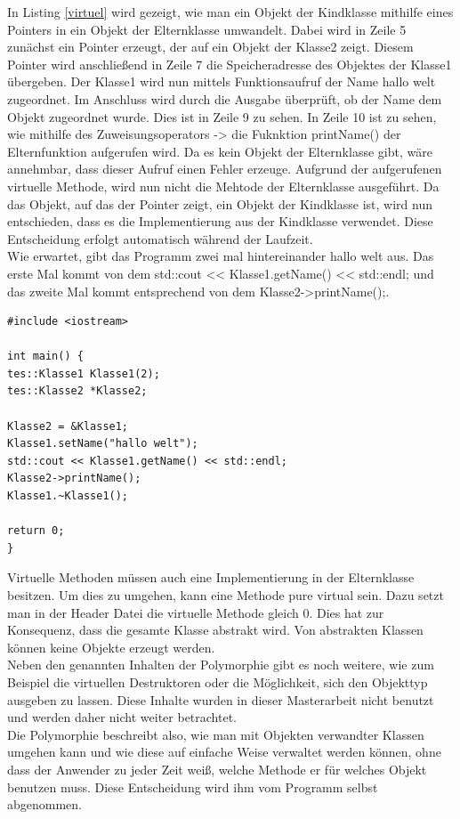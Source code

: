 In Listing \ref{virtuel} wird gezeigt, wie man ein Objekt der Kindklasse mithilfe eines Pointers in ein Objekt der Elternklasse umwandelt. Dabei wird in Zeile 5  zunächst ein Pointer erzeugt, der auf ein Objekt der Klasse2 zeigt. Diesem Pointer wird anschließend in Zeile 7 die Speicheradresse des Objektes der Klasse1 übergeben. Der Klasse1 wird nun mittels Funktionsaufruf der Name  \glqq hallo welt\grqq{} zugeordnet. Im Anschluss wird durch die Ausgabe überprüft, ob der Name dem Objekt zugeordnet wurde. Dies ist in Zeile 9 zu sehen. In Zeile 10 ist zu sehen, wie mithilfe des Zuweisungsoperators \glqq ->\grqq{} die Fuknktion \glqq printName()\grqq{} der Elternfunktion aufgerufen wird. Da es kein Objekt der Elternklasse gibt, wäre annehmbar, dass dieser Aufruf einen Fehler erzeuge. Aufgrund der aufgerufenen virtuelle Methode, wird nun nicht die Mehtode der Elternklasse ausgeführt. Da das Objekt, auf das der Pointer zeigt, ein Objekt der Kindklasse ist, wird nun entschieden, dass es die Implementierung aus der Kindklasse verwendet. Diese Entscheidung erfolgt automatisch während der Laufzeit. \\
Wie erwartet, gibt das Programm zwei mal hintereinander \glqq hallo welt\grqq{} aus. Das erste Mal kommt von dem \glqq std::cout << Klasse1.getName() << std::endl;\grqq{} und das zweite Mal kommt entsprechend von dem \glqq Klasse2->printName();\grqq{}.
\begin{lstlisting}[caption = Beispiel virtuelle Funktion,label=virtuel]
#include <iostream>

int main() {
tes::Klasse1 Klasse1(2);
tes::Klasse2 *Klasse2;

Klasse2 = &Klasse1;
Klasse1.setName("hallo welt");
std::cout << Klasse1.getName() << std::endl;
Klasse2->printName();
Klasse1.~Klasse1();

return 0;
}
\end{lstlisting}
Virtuelle Methoden müssen  auch eine Implementierung in der Elternklasse besitzen. Um dies zu umgehen, kann eine Methode \glqq pure virtual\grqq{} sein. Dazu setzt man in der Header Datei die virtuelle Methode gleich 0. Dies hat zur Konsequenz, dass die gesamte Klasse abstrakt wird. Von abstrakten Klassen können keine Objekte erzeugt werden. 
\\
Neben den genannten Inhalten der Polymorphie gibt es noch weitere, wie zum Beispiel die virtuellen Destruktoren oder die Möglichkeit, sich den Objekttyp ausgeben zu lassen. Diese Inhalte wurden in dieser Masterarbeit nicht benutzt und werden daher nicht weiter betrachtet.
\\
Die Polymorphie beschreibt also, wie man mit Objekten verwandter Klassen umgehen kann und wie diese auf einfache Weise verwaltet werden können, ohne dass der Anwender zu jeder Zeit weiß, welche Methode er für welches Objekt benutzen muss. Diese Entscheidung wird ihm vom Programm selbst abgenommen. 
\\
\cite{HelmutErlenkotter.}
\cite{Prof.Dr.AlfredIrber.}
\cite{Krau.}

